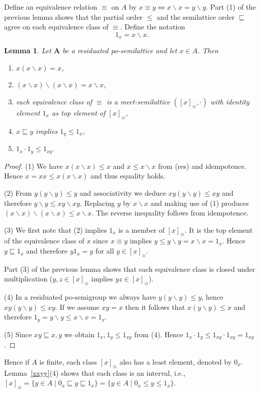\documentclass[12pt]{amsart}
\newtheorem{lemma}[theorem]{Lemma}
\newcommand{\m}{\mathbf} %
\newcommand{\ld}{{\backslash}}
\begin{document}
Define an equivalence relation $\equiv$ on $A$ by $x\equiv y\iff x\ld x=y\ld y$.
Part (1) of the previous lemma shows that the partial order $\le$ and the semilattice order $\sqsubseteq$ agree on each equivalence class of $\equiv$.
Define the notation $$1_x=x\ld x.$$

\begin{lemma}\label{poslat}
Let $\m A$ be a residuated po-semilattice and let $x\in A$. Then
\begin{enumerate}
\item $x(x\ld x)=x$,
\item $(x\ld x)\ld (x\ld x)=x\ld x$,
\item each equivalence class of $\equiv$ is a meet-semilattice $([x]_\equiv,\cdot)$ with identity element $1_x$ as top element of $[x]_\equiv$,
\item $x\sqsubseteq y$ implies $1_y\le 1_x$,
\item $1_x\cdot 1_y\le 1_{xy}$.
\end{enumerate}
\end{lemma}
\begin{proof}
(1) We have $x(x\ld x)\le x$ and $x\le x\ld x$ from (res) and idempotence.
Hence $x=xx\le x(x\ld x)$ and thus equality holds.

(2) From $y(y\ld y)\le y$ and associativity we deduce $xy(y\ld y)\le xy$ and therefore $y\ld y\le xy\ld xy$. Replacing $y$ by $x\ld x$ and making use of (1) produces $(x\ld x)\ld (x\ld x)\le x\ld x$. The reverse inequality follows from
idempotence.

(3) We first note that (2) implies $1_x$ is a member of $[x]_\equiv$.
It is the top element of the equivalence class of $x$ since $x\equiv y$ implies $y\le y\ld y=x\ld x=1_x$. Hence $y\sqsubseteq 1_x$ and therefore
$y1_x=y$ for all $y\in [x]_\equiv$.

Part (3) of the previous lemma shows that each equivalence class is closed under multiplication
($y,z\in[x]_\equiv$ implies $yz\in[x]_\equiv$).

(4) In a residuated po-semigroup we always have $y(y\ld y)\le y$, hence $xy(y\ld y)\le xy$.
If we assume $xy=x$ then it follows that $x(y\ld y)\le x$ and therefore $1_y=y\ld y\le x\ld x=1_x$.

(5) Since $xy\sqsubseteq x, y$ we obtain $1_x,1_y\le 1_{xy}$ from (4). Hence $1_x\cdot 1_y\le 1_{xy}\cdot 1_{xy}=1_{xy}$.
\end{proof}

Hence if $A$ is finite, each class $[x]_\equiv$ also has a least element, denoted by $0_x$. Lemma~\ref{xxyy}(4) shows that each class is an interval, i.e., $[x]_\equiv = \{y\in A\mid 0_x\sqsubseteq y\sqsubseteq 1_x\} = \{y\in A\mid 0_x\le y\le 1_x\}$.
\end{document}
